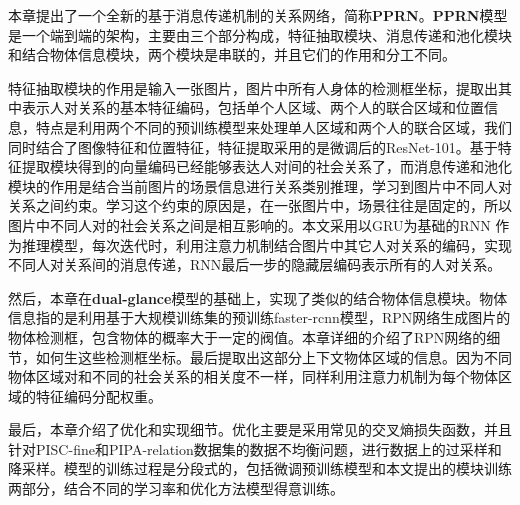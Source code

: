 本章提出了一个全新的基于消息传递机制的关系网络，简称\textbf{PPRN}。\textbf{PPRN}模型是一个端到端的架构，主要由三个部分构成，特征抽取模块、消息传递和池化模块和结合物体信息模块，两个模块是串联的，并且它们的作用和分工不同。

特征抽取模块的作用是输入一张图片，图片中所有人身体的检测框坐标，提取出其中表示人对关系的基本特征编码，包括单个人区域、两个人的联合区域和位置信息，特点是利用两个不同的预训练模型来处理单人区域和两个人的联合区域，我们同时结合了图像特征和位置特征，特征提取采用的是微调后的ResNet-101。基于特征提取模块得到的向量编码已经能够表达人对间的社会关系了，而消息传递和池化模块的作用是结合当前图片的场景信息进行关系类别推理，学习到图片中不同人对关系之间约束。学习这个约束的原因是，在一张图片中，场景往往是固定的，所以图片中不同人对的社会关系之间是相互影响的。本文采用以GRU为基础的RNN 作为推理模型，每次迭代时，利用注意力机制结合图片中其它人对关系的编码，实现不同人对关系间的消息传递，RNN最后一步的隐藏层编码表示所有的人对关系。

然后，本章在\textbf{dual-glance}模型的基础上，实现了类似的结合物体信息模块。物体信息指的是利用基于大规模训练集的预训练faster-rcnn模型，RPN网络生成图片的物体检测框，包含物体的概率大于一定的阀值。本章详细的介绍了RPN网络的细节，如何生这些检测框坐标。最后提取出这部分上下文物体区域的信息。因为不同物体区域对和不同的社会关系的相关度不一样，同样利用注意力机制为每个物体区域的特征编码分配权重。

最后，本章介绍了优化和实现细节。优化主要是采用常见的交叉熵损失函数，并且针对PISC-fine和PIPA-relation数据集的数据不均衡问题，进行数据上的过采样和降采样。模型的训练过程是分段式的，包括微调预训练模型和本文提出的模块训练两部分，结合不同的学习率和优化方法模型得意训练。




